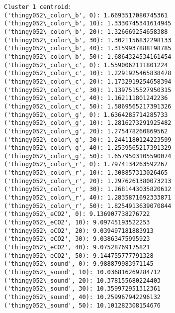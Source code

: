 \documentclass[11pt]{article}
\begin{document}
    \begin{Verbatim}[commandchars=\\\{\}]
Cluster 1 centroid:
('thingy052\_color\_b', 0): 1.6693517080745361
('thingy052\_color\_b', 10): 1.3330745341614945
('thingy052\_color\_b', 20): 1.326669254658388
('thingy052\_color\_b', 30): 1.3021156832298133
('thingy052\_color\_b', 40): 1.3159937888198785
('thingy052\_color\_b', 50): 1.6864324534161454
('thingy052\_color\_c', 0): 1.5590062111801224
('thingy052\_color\_c', 10): 1.2291925465838478
('thingy052\_color\_c', 20): 1.1732919254658394
('thingy052\_color\_c', 30): 1.1397515527950315
('thingy052\_color\_c', 40): 1.162111801242236
('thingy052\_color\_c', 50): 1.5869565217391326
('thingy052\_color\_g', 0): 1.6364285714285733
('thingy052\_color\_g', 10): 1.2816273291925482
('thingy052\_color\_g', 20): 1.275478260869562
('thingy052\_color\_g', 30): 1.2441180124223599
('thingy052\_color\_g', 40): 1.2539565217391329
('thingy052\_color\_g', 50): 1.6579503105590074
('thingy052\_color\_r', 0): 1.7974134263592267
('thingy052\_color\_r', 10): 1.308857313026465
('thingy052\_color\_r', 20): 1.2976261380073213
('thingy052\_color\_r', 30): 1.2681443035820612
('thingy052\_color\_r', 40): 1.2835871692333871
('thingy052\_color\_r', 50): 1.8254913639070844
('thingy052\_eCO2', 0): 9.136907738276722
('thingy052\_eCO2', 10): 9.09745193522253
('thingy052\_eCO2', 20): 9.039497181883913
('thingy052\_eCO2', 30): 9.03863475995923
('thingy052\_eCO2', 40): 9.07528769175821
('thingy052\_eCO2', 50): 9.144755777791328
('thingy052\_sound', 0): 9.988879983971145
('thingy052\_sound', 10): 10.036816269284712
('thingy052\_sound', 20): 10.378155680224403
('thingy052\_sound', 30): 10.359972951312361
('thingy052\_sound', 40): 10.259967942296132
('thingy052\_sound', 50): 10.101282308154676


\end{Verbatim}
\end{document}
